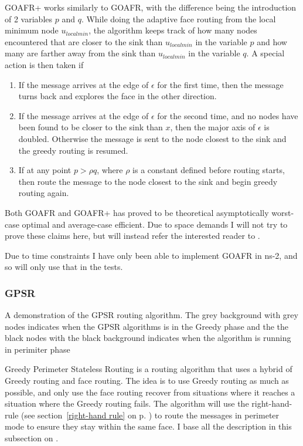GOAFR+ works similarly to GOAFR, with the difference being the introduction of 2 variables $p$ and $q$. While doing the adaptive face routing from the local minimum node $u_{local min}$, the algorithm keeps track of how many nodes encountered that are closer to the sink than $u_{local min}$ in the variable $p$ and how many are farther away from the sink than $u_{local min}$ in the variable $q$.
A special action is then taken if
\begin{enumerate}
\item If the message arrives at the edge of $\epsilon$ for the first time, then the message turns back and explores the face in the other direction. 
\item If the message arrives at the edge of $\epsilon$ for the second time, and no nodes have been found to be closer to the sink than $x$, then the major axis of $\epsilon$ is doubled. Otherwise the message is sent to the node closest to the sink and the greedy routing is resumed.
\item If at any point $p > \rho q$, where $\rho$ is a constant defined before routing starts, then route the message to the node closest to the sink and begin greedy routing again.
\end{enumerate}

Both GOAFR and GOAFR+ has proved to be theoretical asymptotically worst-case optimal and average-case efficient. Due to space demands I will not try to prove these claims here, but will instead refer the interested reader to \cite{gopher+, gopher}.

Due to time constraints I have only been able to implement GOAFR in ns-2, and so will only use that in the tests.

\subsubsection{GPSR}
{A demonstration of the GPSR routing algorithm. The grey background with grey nodes indicates when the GPSR algorithms is in the Greedy phase and the the black nodes with the black background indicates when the algorithm is running in perimiter phase}

\label{section:gpsr}
Greedy Perimeter Stateless Routing is a routing algorithm that uses a hybrid of Greedy routing and face routing. The idea is to use Greedy routing as much as possible, and only use the face routing recover from situations where it reaches a situation where the Greedy routing fails. The algorithm will use the right-hand-rule (see section~\ref{right-hand rule} on p. \pageref{right-hand rule}) to route the messages in perimeter mode to ensure they stay within the same face. I base all the description in this subsection on \cite{gpsr}.

